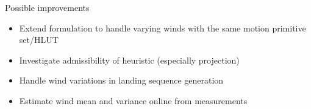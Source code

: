 \documentclass{beamer}
\begin{document}
\begin{frame}{Possible improvements}

\begin{itemize}
    \item Extend formulation to handle varying winds with the same motion primitive set/HLUT 
    \item Investigate admissibility of heuristic (especially projection)
    \item Handle wind variations in landing sequence generation
    \item Estimate wind mean and variance online from measurements
\end{itemize}
    
\end{frame}
\end{document}
